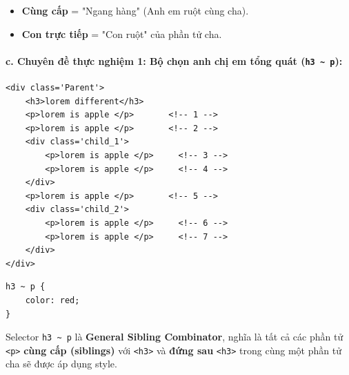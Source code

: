\documentclass[11pt,oneside]{book}
\newcommand{\codeinline}[1]{\textcolor{accentOrange}{\texttt{#1}}}
\newcommand{\term}[1]{\textbf{\textcolor{primaryBlue}{#1}}}
\begin{document}
\begin{tipBox}
\begin{itemize}[leftmargin=1.5em, itemsep=3pt, parsep=0pt]
    \item \textbf{Cùng cấp} = "Ngang hàng" (Anh em ruột cùng cha).
    \item \textbf{Con trực tiếp} = "Con ruột" của phần tử cha.
\end{itemize}
\end{tipBox}

\paragraph{c. Chuyên đề thực nghiệm 1: Bộ chọn anh chị em tổng quát (\codeinline{h3 \textasciitilde{} p}):}

\begin{codeWindow}
\begin{lstlisting}[language=HTML5]
<div class='Parent'>
    <h3>lorem different</h3>
    <p>lorem is apple </p>       <!-- 1 -->
    <p>lorem is apple </p>       <!-- 2 -->
    <div class='child_1'>
        <p>lorem is apple </p>     <!-- 3 -->
        <p>lorem is apple </p>     <!-- 4 -->
    </div>
    <p>lorem is apple </p>       <!-- 5 -->
    <div class='child_2'>
        <p>lorem is apple </p>     <!-- 6 -->
        <p>lorem is apple </p>     <!-- 7 -->
    </div>
</div>
\end{lstlisting}

\begin{lstlisting}[language=CSS3]
h3 ~ p {
    color: red;
}
\end{lstlisting}
\end{codeWindow}

\begin{conceptBox}
Selector \codeinline{h3 \textasciitilde{} p} là \term{General Sibling Combinator}, nghĩa là tất cả các phần tử \codeinline{<p>} \textbf{cùng cấp (siblings)} với \codeinline{<h3>} và \textbf{đứng sau} \codeinline{<h3>} trong cùng một phần tử cha sẽ được áp dụng style.
\end{conceptBox}
\end{document}
